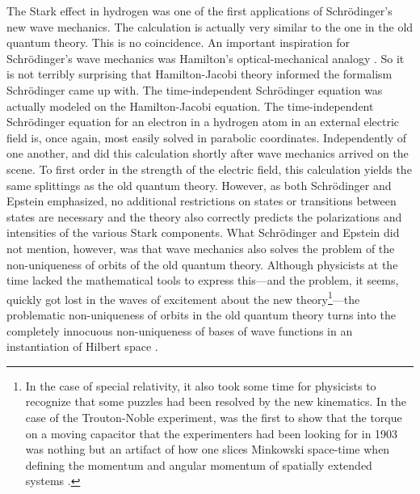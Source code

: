 The Stark effect in hydrogen was one of the first applications of Schr\"odinger's new wave mechanics. The calculation is actually very similar to the one in the old quantum theory. This is no coincidence. An important inspiration for Schr\"odinger's wave mechanics was Hamilton's optical-mechanical analogy \citep{Joas and Lehner 2009}. So it is not terribly surprising that Hamilton-Jacobi theory informed the formalism Schr\"odinger came up with. The time-independent Schr\"odinger equation was actually modeled on the Hamilton-Jacobi equation. The  time-independent Schr\"odinger equation for an electron in a hydrogen atom in an external electric field is, once again, most easily solved in parabolic coordinates. Independently of one another, \citet{Schroedinger 1926} and \citet{Epstein 1926} did this calculation shortly after wave mechanics arrived on the scene. To first order in the strength of the electric field, this calculation yields the same splittings as the old quantum theory. However, as both Schr\"odinger and Epstein emphasized, no additional restrictions on states or transitions between states are necessary and the theory also correctly predicts the polarizations and intensities of the various Stark components. What Schr\"odinger and Epstein did not mention, however, was that wave mechanics also solves the problem of the non-uniqueness of orbits of the old quantum theory. Although physicists at the time lacked the mathematical tools to express this---and the problem, it seems, quickly got lost in the waves of excitement about the new theory\footnote{In the case of special relativity, it also took some time for physicists to recognize that some puzzles had been resolved by the new kinematics. In the case of the Trouton-Noble experiment, \citet{Butler 1968} was the first to show that the torque on a moving capacitor that the experimenters had been looking for in 1903 was nothing but an artifact of how one slices Minkowski space-time when defining the momentum and angular momentum of spatially extended systems \citep[p.\ 45; see also Teukolsky, 1996]{Janssen 2009}.}---the problematic non-uniqueness of orbits in the old quantum theory turns into the completely innocuous non-uniqueness of bases of wave functions in an instantiation of Hilbert space \citep[sec.\ 5, pp.\ 76--77]{Duncan and Janssen 2014}.

